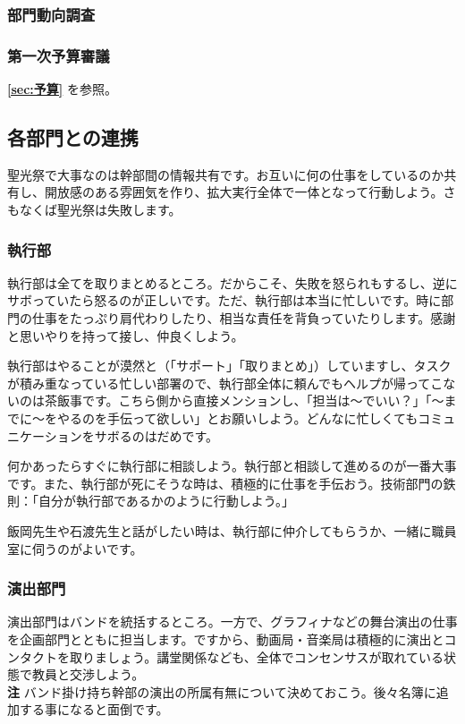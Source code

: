 \documentclass[dvipdfmx,jb5]{jarticle}
\begin{document}
\subsubsection{部門動向調査}


\subsubsection{第一次予算審議}
{\bf \ref{sec:予算}} を参照。



\subsection{各部門との連携}
聖光祭で大事なのは幹部間の情報共有です。お互いに何の仕事をしているのか共有し、開放感のある雰囲気を作り、拡大実行全体で一体となって行動しよう。さもなくば聖光祭は失敗します。

\subsubsection{執行部}
執行部は全てを取りまとめるところ。だからこそ、失敗を怒られもするし、逆にサボっていたら怒るのが正しいです。ただ、執行部は本当に忙しいです。時に部門の仕事をたっぷり肩代わりしたり、相当な責任を背負っていたりします。感謝と思いやりを持って接し、仲良くしよう。

執行部はやることが漠然と（「サポート」「取りまとめ」）していますし、タスクが積み重なっている忙しい部署ので、執行部全体に頼んでもヘルプが帰ってこないのは茶飯事です。こちら側から直接メンションし、「担当は〜でいい？」「〜までに〜をやるのを手伝って欲しい」とお願いしよう。どんなに忙しくてもコミュニケーションをサボるのはだめです。

何かあったらすぐに執行部に相談しよう。執行部と相談して進めるのが一番大事です。また、執行部が死にそうな時は、積極的に仕事を手伝おう。技術部門の鉄則：「自分が執行部であるかのように行動しよう。」

飯岡先生や石渡先生と話がしたい時は、執行部に仲介してもらうか、一緒に職員室に伺うのがよいです。

\subsubsection{演出部門}\label{sec:演出部門}
演出部門はバンドを統括するところ。一方で、グラフィナなどの舞台演出の仕事を企画部門とともに担当します。ですから、動画局・音楽局は積極的に演出とコンタクトを取りましょう。講堂関係なども、全体でコンセンサスが取れている状態で教員と交渉しよう。\\
{\bf 注} バンド掛け持ち幹部の演出の所属有無について決めておこう。後々名簿に追加する事になると面倒です。
\end{document}
